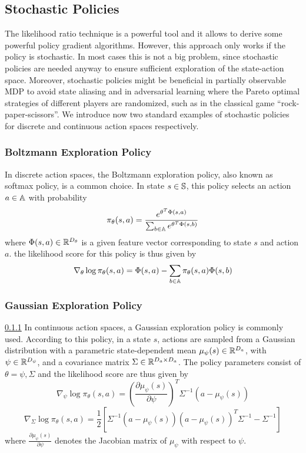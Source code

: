 \subsection{Stochastic Policies}
The likelihood ratio technique is a powerful tool and it allows to derive some powerful policy gradient algorithms. However, this approach only works if the policy is  stochastic. In most cases this is not a big problem, since stochastic policies are needed anyway to ensure sufficient exploration of the state-action space. Moreover, stochastic policies might be beneficial in partially observable MDP to avoid state aliasing and in adversarial learning where the Pareto optimal strategies of different players are randomized, such as in the classical game ``rock-paper-scissors''. We introduce now two standard examples of stochastic policies for discrete and continuous action spaces respectively.  

\subsubsection{Boltzmann Exploration Policy}
\label{sec:softmax}
In discrete action spaces, the Boltzmann exploration policy, also known as softmax policy, is a common choice. In state $s \in \S$, this policy selects an action $a \in \A$ with probability 
\begin{equation}
	\pi_\theta(s,a) = \frac{e^{\theta^T \Phi(s,a)}}{\sum_{b \in \A} e^{\theta^T \Phi(s,b)}}
\end{equation}    
where $\Phi(s,a) \in \R^{D_\theta}$ is a given feature vector corresponding to state $s$ and action $a$. the likelihood score for this policy is thus given by 
\begin{equation}
\nabla_\theta \log \pi_\theta(s,a) = \Phi(s,a) - \sum_{b\in\A} \pi_\theta(s,a) \Phi(s,b)
\end{equation}

\subsubsection{Gaussian Exploration Policy} 
\ref{sec:softmax}
In continuous action spaces, a Gaussian exploration policy is commonly used. According to this policy, in a state $s$, actions are sampled from a Gaussian distribution with a parametric state-dependent mean $\mu_\psi(s) \in \R^{D_a}$, with $\psi \in \R^{D_\psi}$, and a covariance matrix $\Sigma \in \R^{D_a \times D_a}$. The policy parameters consist of $\theta = {\psi, \Sigma}$ and the likelihood score are thus given by 
\begin{equation}
	\nabla_\psi \log \pi_\theta(s,a) = \left(\frac{\partial \mu_\psi(s)}{\partial \psi}\right)^T \Sigma^{-1} (a - \mu_\psi(s))
\end{equation}
\begin{equation}
	\nabla_\Sigma \log \pi_\theta(s,a) = \frac{1}{2}\left[\Sigma^{-1} \left(a - \mu_\psi(s)\right) \left(a - \mu_\psi(s)\right)^T \Sigma^{-1} - \Sigma^{-1}\right]
\end{equation}
where $\frac{\partial \mu_\psi(s)}{\partial \psi}$ denotes the Jacobian matrix of $\mu_\psi$ with respect to $\psi$.

